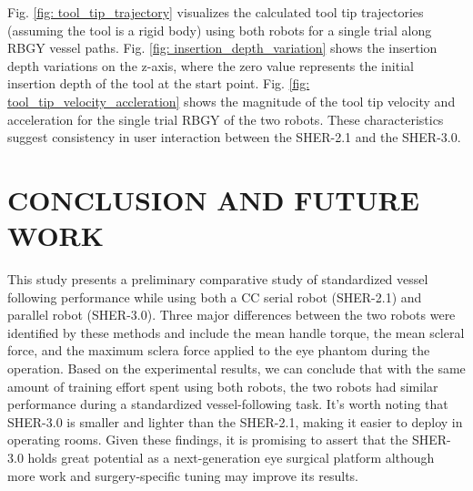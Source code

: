 \documentclass[letterpaper, 10 pt, conference]{ieeeconf}  %
\begin{document}
Fig. \ref{fig: tool_tip_trajectory} visualizes the calculated tool tip trajectories (assuming the tool is a rigid body) using both robots for a single trial along RBGY vessel paths. 
Fig. \ref{fig: insertion_depth_variation} shows the insertion depth variations on the z-axis, where the zero value represents the initial insertion depth of the tool at the start point.
Fig. \ref{fig: tool_tip_velocity_accleration} shows the magnitude of the tool tip velocity and acceleration for the single trial RBGY of the two robots.
These characteristics suggest consistency in user interaction between the SHER-2.1 and the SHER-3.0.

\section{CONCLUSION AND FUTURE WORK}

This study presents a preliminary comparative study of standardized vessel following performance while using both a CC serial robot (SHER-2.1) and parallel robot (SHER-3.0). 
Three major differences between the two robots were identified by these methods and include the mean handle torque, the mean scleral force, and the maximum sclera force applied to the eye phantom
during the operation. Based on the experimental results, we can conclude that with the same amount of training effort spent using both robots, the two robots had similar performance during a standardized vessel-following task. 
It's worth noting that SHER-3.0 is smaller and lighter than the SHER-2.1, making it easier to deploy in operating rooms. Given these findings, it is promising to assert that the SHER-3.0 holds great potential as a next-generation eye surgical platform although more work and surgery-specific tuning may improve its results.
\end{document}
